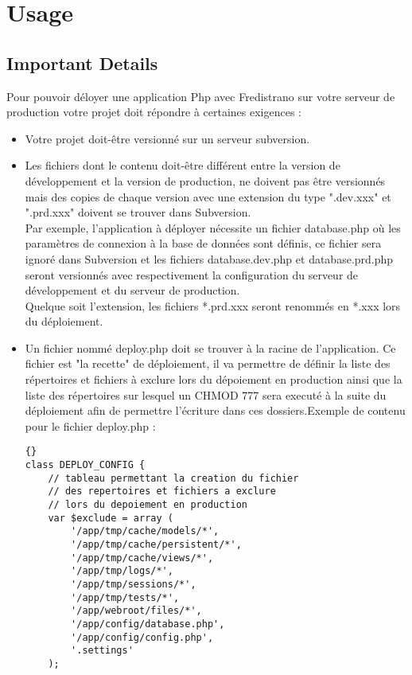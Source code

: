 \documentclass[12pt,a4paper]{report}
\begin{document}
\chapter{Usage}
\section{Important Details}\label{precimportantes}
Pour pouvoir déloyer une application Php avec Fredistrano sur votre serveur de production votre projet doit répondre à certaines exigences :\\
\begin{itemize}
\item Votre projet doit-être versionné sur un serveur subversion.\\
\item Les fichiers dont le contenu doit-\^{e}tre différent entre la version de développement et la version de production, ne doivent pas être versionnés mais des copies de chaque version avec une extension du type ".dev.xxx" et ".prd.xxx" doivent se trouver dans Subversion.\\
Par exemple, l'application à déployer nécessite un fichier database.php où les paramètres de connexion à la base de données sont définis, ce fichier sera ignoré dans Subversion et les fichiers database.dev.php et database.prd.php seront versionnés avec respectivement la configuration du serveur de développement et du serveur de production.\\
Quelque soit l'extension, les fichiers *.prd.xxx seront renommés en *.xxx lors du déploiement.\\
\item Un fichier nommé deploy.php doit se trouver à la racine de l'application. Ce fichier est "la recette" de déploiement, il va permettre de définir la liste des répertoires et fichiers à exclure lors du dépoiement en production ainsi que la liste des répertoires sur lesquel un CHMOD 777 sera executé à la suite du déploiement afin de permettre l'écriture dans ces dossiers.\newpage Exemple de contenu pour le fichier deploy.php :\\

\lstset{language=Php}
\lstset{commentstyle=\textit}
\begin{lstlisting}[frame=tb]{}
class DEPLOY_CONFIG {
	// tableau permettant la creation du fichier
	// des repertoires et fichiers a exclure 
	// lors du depoiement en production
	var $exclude = array (
		'/app/tmp/cache/models/*',
		'/app/tmp/cache/persistent/*',
		'/app/tmp/cache/views/*',
		'/app/tmp/logs/*',
		'/app/tmp/sessions/*',
		'/app/tmp/tests/*',
		'/app/webroot/files/*',
		'/app/config/database.php',
		'/app/config/config.php',
		'.settings'
	);


\end{lstlisting}
\end{itemize}
\end{document}

